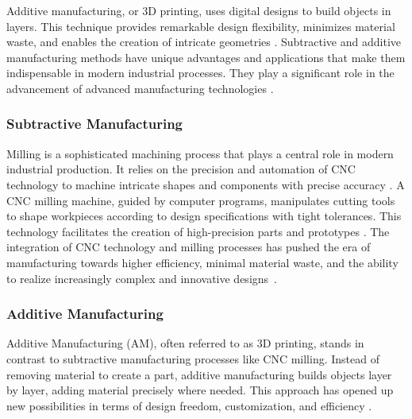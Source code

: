 \documentclass[ZLstudentexpose%
              ,optBiber%
              ,optEnglish%
              ,10pt
              ]{ZLlatex}%
\begin{document}
Additive manufacturing, or 3D printing, uses digital designs to build objects in layers. This technique provides remarkable design flexibility, minimizes material waste, and enables the creation of intricate geometries \cite{Dilberoglu.2017}. Subtractive and additive manufacturing methods have unique advantages and applications that make them indispensable in modern industrial processes. They play a significant role in the advancement of advanced manufacturing technologies \cite{Bandyopadhyay.2020, vanLe.2017}.



\subsubsection{Subtractive Manufacturing}
Milling is a sophisticated machining process that plays a central role in modern industrial production. It relies on the precision and automation of CNC technology to machine intricate shapes and components with precise accuracy \cite{Jayawardane.2023}. A CNC milling machine, guided by computer programs, manipulates cutting tools to shape workpieces according to design specifications with tight tolerances. This technology facilitates the creation of high-precision parts and prototypes \cite{Amanullah.2017}. The integration of CNC technology and milling processes has pushed the era of manufacturing towards higher efficiency, minimal material waste, and the ability to realize increasingly complex and innovative designs~\cite{Wang.2023}.
\newpage
\subsubsection{Additive Manufacturing}
Additive Manufacturing (AM), often referred to as 3D printing, stands in contrast to subtractive manufacturing processes like CNC milling. Instead of removing material to create a part, additive manufacturing builds objects layer by layer, adding material precisely where needed. This approach has opened up new possibilities in terms of design freedom, customization, and efficiency \cite{Prakash.2018}.
\end{document}
